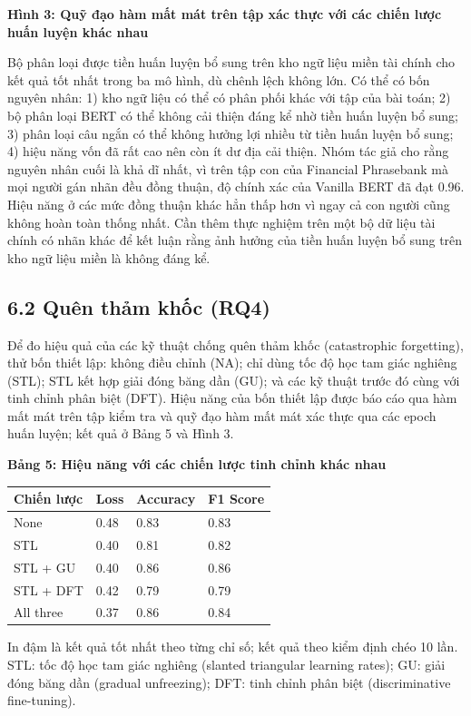 \textbf{Hình 3: Quỹ đạo hàm mất mát trên tập xác thực với các chiến lược huấn luyện khác nhau}

Bộ phân loại được tiền huấn luyện bổ sung trên kho ngữ liệu miền tài chính cho kết quả tốt nhất trong ba mô hình, dù chênh lệch không lớn. Có thể có bốn nguyên nhân: 1) kho ngữ liệu có thể có phân phối khác với tập của bài toán; 2) bộ phân loại BERT có thể không cải thiện đáng kể nhờ tiền huấn luyện bổ sung; 3) phân loại câu ngắn có thể không hưởng lợi nhiều từ tiền huấn luyện bổ sung; 4) hiệu năng vốn đã rất cao nên còn ít dư địa cải thiện. Nhóm tác giả cho rằng nguyên nhân cuối là khả dĩ nhất, vì trên tập con của Financial Phrasebank mà mọi người gán nhãn đều đồng thuận, độ chính xác của Vanilla BERT đã đạt 0.96. Hiệu năng ở các mức đồng thuận khác hẳn thấp hơn vì ngay cả con người cũng không hoàn toàn thống nhất. Cần thêm thực nghiệm trên một bộ dữ liệu tài chính có nhãn khác để kết luận rằng ảnh hưởng của tiền huấn luyện bổ sung trên kho ngữ liệu miền là không đáng kể.

\subsection{6.2 Quên thảm khốc (RQ4)}

Để đo hiệu quả của các kỹ thuật chống quên thảm khốc (catastrophic forgetting), thử bốn thiết lập: không điều chỉnh (NA); chỉ dùng tốc độ học tam giác nghiêng (STL); STL kết hợp giải đóng băng dần (GU); và các kỹ thuật trước đó cùng với tinh chỉnh phân biệt (DFT). Hiệu năng của bốn thiết lập được báo cáo qua hàm mất mát trên tập kiểm tra và quỹ đạo hàm mất mát xác thực qua các epoch huấn luyện; kết quả ở Bảng 5 và Hình 3.

\textbf{Bảng 5: Hiệu năng với các chiến lược tinh chỉnh khác nhau}

{\small
\begin{longtable}[]{@{}llll@{}}
\toprule\noalign{}
Chiến lược & Loss & Accuracy & F1 Score \\
\midrule\noalign{}
\endhead
\bottomrule\noalign{}
\endlastfoot
None & 0.48 & 0.83 & 0.83 \\
STL & 0.40 & 0.81 & 0.82 \\
STL + GU & 0.40 & 0.86 & 0.86 \\
STL + DFT & 0.42 & 0.79 & 0.79 \\
All three & 0.37 & 0.86 & 0.84 \\
\end{longtable}
}

In đậm là kết quả tốt nhất theo từng chỉ số; kết quả theo kiểm định chéo 10 lần. STL: tốc độ học tam giác nghiêng (slanted triangular learning rates); GU: giải đóng băng dần (gradual unfreezing); DFT: tinh chỉnh phân biệt (discriminative fine-tuning).

